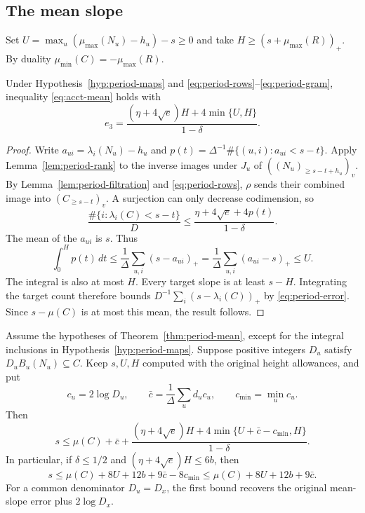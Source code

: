 \subsection{The mean slope}

Set $U=\max_u(\mu_{\max}(N_u)-h_u)-s\ge0$ and take
$H\ge(s+\mu_{\max}(R))_+$. By duality $\mu_{\min}(C)=-\mu_{\max}(R)$.

\begin{theorem}\label{thm:period-mean}
Under Hypothesis~\ref{hyp:period-maps} and
\eqref{eq:period-rows}--\eqref{eq:period-gram}, inequality
\eqref{eq:acct-mean} holds with
\begin{equation}\label{eq:period-error}
 e_3=\frac{(\eta+4\sqrt e)H+4\min\{U,H\}}{1-\delta}.
\end{equation}
\end{theorem}

\begin{proof}
Write $a_{ui}=\lambda_i(N_u)-h_u$ and
$p(t)=\Delta^{-1}\#\{(u,i):a_{ui}<s-t\}$. Apply
Lemma~\ref{lem:period-rank} to the inverse images under $J_u$ of
$((N_u)_{\ge s-t+h_u})_v$. By Lemma~\ref{lem:period-filtration}
and \eqref{eq:period-rows}, $\rho$ sends their combined image into
$(C_{\ge s-t})_v$. A surjection can only decrease codimension, so
\[
 \frac{\#\{i:\lambda_i(C)<s-t\}}D
     \le\frac{\eta+4\sqrt e+4p(t)}{1-\delta}.
\]
The mean of the $a_{ui}$ is $s$. Thus
\[
 \int_0^H p(t)\,dt
 \le\frac1\Delta\sum_{u,i}(s-a_{ui})_+
 =\frac1\Delta\sum_{u,i}(a_{ui}-s)_+\le U .
\]
The integral is also at most $H$. Every target slope is at least $s-H$.
Integrating the target count therefore bounds
$D^{-1}\sum_i(s-\lambda_i(C))_+$ by \eqref{eq:period-error}.
Since $s-\mu(C)$ is at most this mean, the result follows.
\end{proof}

\begin{proposition}
\label{prop:period-denominator-average}
Assume the hypotheses of Theorem~\ref{thm:period-mean}, except for
the integral inclusions in Hypothesis~\ref{hyp:period-maps}.
Suppose positive integers $D_u$ satisfy $D_uB_u(N_u)\subseteq C$.
Keep $s,U,H$ computed with the original height allowances, and put
\[
 c_u=2\log D_u,\qquad
 \bar c=\frac{1}{\Delta}\sum_u d_uc_u,\qquad
 c_{\min}=\min_u c_u.
\]
Then
\begin{equation}\label{eq:period-denominator-average}
 s\le\mu(C)+\bar c+
 \frac{(\eta+4\sqrt e)H+
       4\min\{U+\bar c-c_{\min},H\}}{1-\delta}.
\end{equation}
In particular, if $\delta\le1/2$ and
$(\eta+4\sqrt e)H\le6b$, then
\[
 s\le\mu(C)+8U+12b+9\bar c-8c_{\min}
       \le\mu(C)+8U+12b+9\bar c.
\]
For a common denominator $D_u=D_x$, the first bound recovers the
original mean-slope error plus $2\log D_x$.
\end{proposition}

